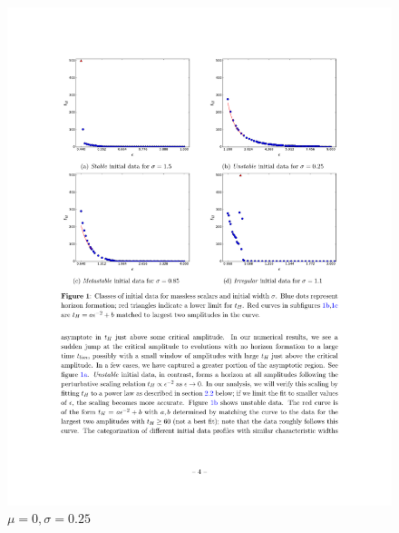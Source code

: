 \documentclass[mathserif,10pt]{beamer}
\begin{document}
{{\begin{columns}
\begin{figure}
      \includegraphics[scale=0.75]{m0w025} \\ $\mu = 0, \sigma = 0.25$
      \end{figure}
    \end{columns}
  }
}

\end{document}
